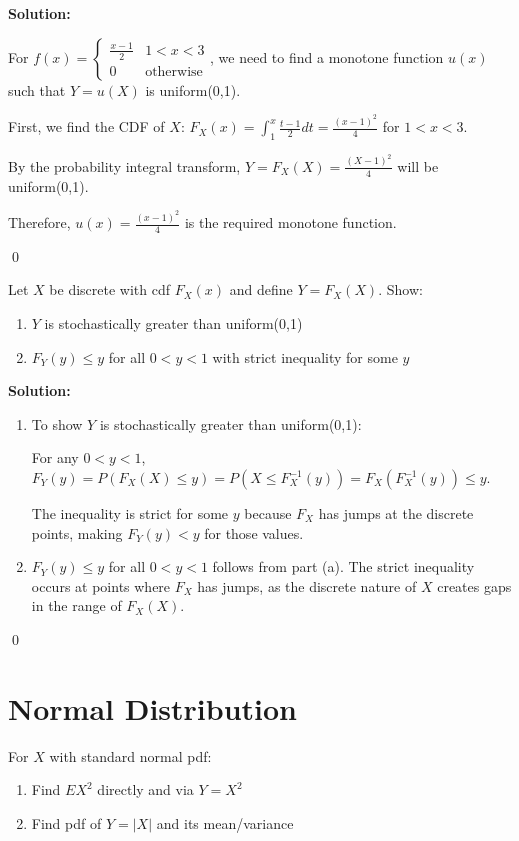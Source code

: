 \noindent\textbf{Solution:}

For $f(x) = \begin{cases} \frac{x-1}{2} & 1<x<3 \\ 0 & \text{otherwise} \end{cases}$, we need to find a monotone function $u(x)$ such that $Y=u(X)$ is uniform(0,1).

First, we find the CDF of $X$:
$F_X(x) = \int_1^x \frac{t-1}{2}dt = \frac{(x-1)^2}{4}$ for $1 < x < 3$.

By the probability integral transform, $Y = F_X(X) = \frac{(X-1)^2}{4}$ will be uniform(0,1).

Therefore, $u(x) = \frac{(x-1)^2}{4}$ is the required monotone function.


\qed
\begin{problembox}
Let $X$ be discrete with cdf $F_X(x)$ and define $Y=F_X(X)$. Show:
\begin{enumerate}[label=(\alph*)]
    \item $Y$ is stochastically greater than uniform(0,1)
    \item $F_Y(y) \leq y$ for all $0<y<1$ with strict inequality for some $y$
\end{enumerate}
\end{problembox}

\noindent\textbf{Solution:}
\begin{enumerate}[label=(\alph*)]
    \item To show $Y$ is stochastically greater than uniform(0,1):
    
    For any $0 < y < 1$, $F_Y(y) = P(F_X(X) \leq y) = P(X \leq F_X^{-1}(y)) = F_X(F_X^{-1}(y)) \leq y$.
    
    The inequality is strict for some $y$ because $F_X$ has jumps at the discrete points, making $F_Y(y) < y$ for those values.
    
    \item $F_Y(y) \leq y$ for all $0 < y < 1$ follows from part (a). The strict inequality occurs at points where $F_X$ has jumps, as the discrete nature of $X$ creates gaps in the range of $F_X(X)$.
\end{enumerate}


\qed
\section{Normal Distribution}

\begin{problembox}
For $X$ with standard normal pdf:
\begin{enumerate}[label=(\alph*)]
    \item Find $EX^2$ directly and via $Y=X^2$
    \item Find pdf of $Y=|X|$ and its mean/variance
\end{enumerate}
\end{problembox}

